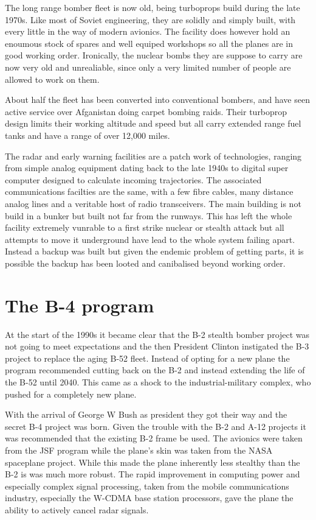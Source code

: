 \documentclass{amsart}
\begin{document}
\begin{multicols}{3}
The long range bomber fleet is now old, being turboprops build during
the late 1970s.  Like most of Soviet engineering, they are solidly and
simply built, with every little in the way of modern avionics.  The
facility does however hold an enoumous stock of spares and well
equiped workshops so all the planes are in good working order.
Ironically, the nuclear bombs they are suppose to carry are now very
old and unrealiable, since only a very limited number of people are
allowed to work on them.

About half the fleet has been converted into conventional bombers, and
have seen active service over Afganistan doing carpet bombing raids.
Their turboprop design limits their working altitude and speed but all
carry extended range fuel tanks and have a range of over 12,000 miles.

The radar and early warning facilities are a patch work of
technologies, ranging from simple analog equipment dating back to the
late 1940s to digital super computer designed to calculate incoming
trajectories.  The associated communications facilties are the same,
with a few fibre cables, many distance analog lines and a veritable
host of radio transceivers.  The main building is not build in a
bunker but built not far from the runways.  This has left the whole
facility extremely vunrable to a first strike nuclear or stealth
attack but all attempts to move it underground have lead to the whole
system failing apart.  Instead a backup was built but given the
endemic problem of getting parts, it is possible the backup has been
looted and canibalised beyond working order.

\section{The B-4 program}

At the start of the 1990s it became clear that the B-2 stealth bomber
project was not going to meet expectations and the then President
Clinton instigated the B-3 project to replace the aging B-52 fleet.
Instead of opting for a new plane the program recommended cutting back
on the B-2 and instead extending the life of the B-52 until 2040.  This
came as a shock to the industrial-military complex, who pushed for a
completely new plane.

With the arrival of George W Bush as president they got their way and
the secret B-4 project was born.  Given the trouble with the B-2 and
A-12 projects it was recommended that the existing B-2 frame be used.
The avionics were taken from the JSF program while the plane's skin
was taken from the NASA spaceplane project.  While this made the plane
inherently less stealthy than the B-2 is was much more robust.  The
rapid improvement in computing power and especially complex signal
processing, taken from the mobile communications industry, especially
the W-CDMA base station processors, gave the plane the ability to
actively cancel radar signals.


\end{multicols}
\end{document}
